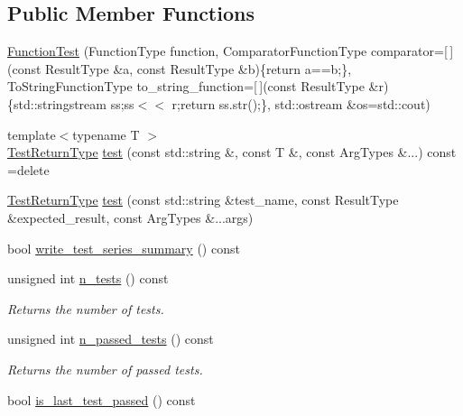 \subsection*{Public Member Functions}
\begin{DoxyCompactItemize}
\item 
\hyperlink{classunittest_1_1_function_test_a02f22a526440d3b556b84b760aea95a2}{Function\+Test} (Function\+Type function, Comparator\+Function\+Type comparator=\mbox{[}$\,$\mbox{]}(const Result\+Type \&a, const Result\+Type \&b)\{return a==b;\}, To\+String\+Function\+Type to\+\_\+string\+\_\+function=\mbox{[}$\,$\mbox{]}(const Result\+Type \&r)\{std\+::stringstream ss;ss$<$$<$ r;return ss.\+str();\}, std\+::ostream \&os=std\+::cout)
\item 
{\footnotesize template$<$typename T $>$ }\\\hyperlink{structunittest_1_1_function_test_1_1_test_return_type}{Test\+Return\+Type} \hyperlink{classunittest_1_1_function_test_a25ae63b50e7339b313ed11e0ba1e02dc}{test} (const std\+::string \&, const T \&, const Arg\+Types \&...) const  =delete
\item 
\hyperlink{structunittest_1_1_function_test_1_1_test_return_type}{Test\+Return\+Type} \hyperlink{classunittest_1_1_function_test_adeb82aea0d7e1975da9f55d5170d31d6}{test} (const std\+::string \&test\+\_\+name, const Result\+Type \&expected\+\_\+result, const Arg\+Types \&...args)
\item 
bool \hyperlink{classunittest_1_1_function_test_a1263b315394a9d4d8bf2a7f5e66be9c6}{write\+\_\+test\+\_\+series\+\_\+summary} () const 
\item 
unsigned int \hyperlink{classunittest_1_1_function_test_a377bc6b2de27ae65ca82f7f063691745}{n\+\_\+tests} () const \hypertarget{classunittest_1_1_function_test_a377bc6b2de27ae65ca82f7f063691745}{}\label{classunittest_1_1_function_test_a377bc6b2de27ae65ca82f7f063691745}

\begin{DoxyCompactList}\small\item\em Returns the number of tests. \end{DoxyCompactList}\item 
unsigned int \hyperlink{classunittest_1_1_function_test_acc025a166bf4840d426e2a9f0b639297}{n\+\_\+passed\+\_\+tests} () const \hypertarget{classunittest_1_1_function_test_acc025a166bf4840d426e2a9f0b639297}{}\label{classunittest_1_1_function_test_acc025a166bf4840d426e2a9f0b639297}

\begin{DoxyCompactList}\small\item\em Returns the number of passed tests. \end{DoxyCompactList}\item 
bool \hyperlink{classunittest_1_1_function_test_a986ab165971bbf218117ef36a9b6cda0}{is\+\_\+last\+\_\+test\+\_\+passed} () const \hypertarget{classunittest_1_1_function_test_a986ab165971bbf218117ef36a9b6cda0}{}\label{classunittest_1_1_function_test_a986ab165971bbf218117ef36a9b6cda0}


\end{DoxyCompactItemize}
